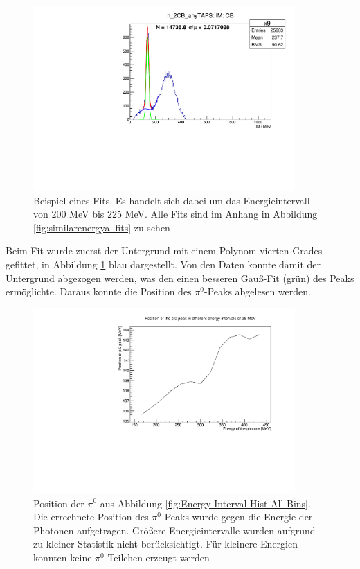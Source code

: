 \documentclass[a4paper,11pt,oneside,final,german,openbib,pdftex]{scrbook}
\begin{document}
{\begin{figure}[h]
	\begin{center}
		\includegraphics[width=100mm]{fitexampleenergyinterval0903}
		
		\caption{Beispiel eines Fits. Es handelt sich dabei um das Energieintervall von 200 MeV bis 225 MeV. Alle Fits sind im Anhang in Abbildung \ref{fig:similarenergyallfits} zu sehen}
		\label{fig:fitexampleenergyinterval0903}	
\end{center}
\end{figure}
 Beim Fit wurde zuerst der Untergrund mit einem Polynom vierten Grades gefittet, in Abbildung \ref{fig:fitexampleenergyinterval0903} blau dargestellt. Von den Daten konnte damit der Untergrund abgezogen werden, was den einen besseren Gauß-Fit (grün) des Peaks ermöglichte. Daraus konnte die Position des $\pi^0$-Peaks abgelesen werden. 
 
 \begin{figure}[h]
 	\begin{center}
 		\includegraphics[width=100mm]{energydependency0903}
 	
 		\caption{Position der $\pi^0$ aus Abbildung \ref{fig:Energy-Interval-Hist-All-Bins}. Die errechnete Position des $\pi^0$ Peaks wurde gegen die Energie der Photonen aufgetragen. Gr\"o{\ss}ere Energieintervalle wurden aufgrund zu kleiner Statistik nicht ber\"ucksichtigt. F\"ur kleinere Energien konnten keine $\pi^0$ Teilchen erzeugt werden} 
 		\label{fig.Energydependency_pion}
 	\end{center}
 \end{figure}

}
\end{document}
